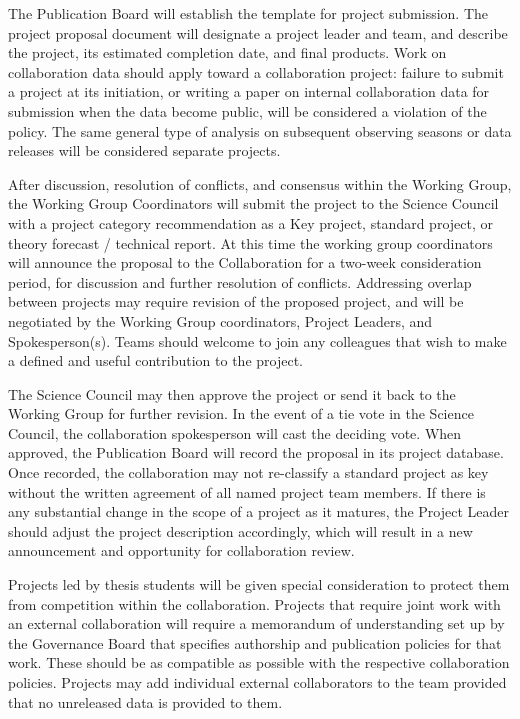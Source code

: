 The Publication Board will establish the template for project submission.  The project proposal document will designate a project leader and team, and describe the project, its estimated completion date, and final products.  Work on collaboration data should apply toward a collaboration project: failure to submit a project at its initiation, or writing a paper on internal collaboration data for submission when the data become public, will be considered a violation of the policy.  The same general type of analysis on subsequent observing seasons or data releases will be considered separate projects.

After discussion, resolution of conflicts, and consensus within the Working Group, the Working Group Coordinators will submit the project to the Science Council with a project category recommendation as a Key project, standard project, or theory forecast / technical report.  At this time the working group coordinators will announce the proposal to the Collaboration for a two-week consideration period, for discussion and further resolution of conflicts.  Addressing overlap between projects may require revision of the proposed project, and will be negotiated by the Working Group coordinators, Project Leaders, and Spokesperson(s).  Teams should welcome to join any colleagues that wish to make a defined and useful contribution to the project.

The Science Council may then approve the project or send it back to the Working Group for further revision.  In the event of a tie vote in the Science Council, the collaboration spokesperson  will cast the deciding vote.  When approved, the Publication Board will record the proposal in its project database.  Once recorded, the collaboration may not re-classify a standard project as key without the written agreement of all named project team members.  If there is any substantial change in the scope of a project as it matures, the Project Leader should adjust the project description accordingly, which will result in a new announcement and opportunity for collaboration review.

Projects led by thesis students will be given special consideration to protect them from competition within the collaboration.  Projects that require joint work with an external collaboration will require a memorandum of understanding set up by the Governance Board that specifies authorship and publication policies for that work.  These should be as compatible as possible with the respective collaboration policies.  Projects may add individual external collaborators to the team provided that no unreleased data is provided to them.

